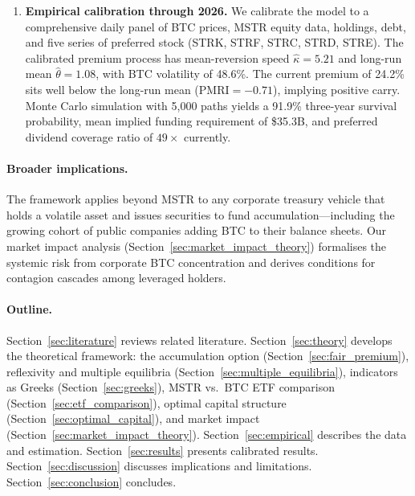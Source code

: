 \begin{enumerate}[leftmargin=*]
  \item \textbf{Empirical calibration through 2026.}
    We calibrate the model to a comprehensive daily panel of BTC prices,
    MSTR equity data, holdings, debt, and five series of preferred stock
    (STRK, STRF, STRC, STRD, STRE).  The calibrated premium process has
    mean-reversion speed $\hat\kappa = 5.21$ and long-run mean
    $\hat\theta = 1.08$, with BTC volatility of 48.6\%.  The current
    premium of 24.2\% sits well below the long-run mean
    ($\text{PMRI} = -0.71$), implying positive carry.
    Monte Carlo simulation with 5,000 paths yields a 91.9\% three-year
    survival probability, mean implied funding requirement of \$35.3B, and
    preferred dividend coverage ratio of $49\times$ currently.
\end{enumerate}

\paragraph{Broader implications.}
The framework applies beyond MSTR to any corporate treasury vehicle that
holds a volatile asset and issues securities to fund accumulation---including
the growing cohort of public companies adding BTC to their balance sheets.
Our market impact analysis (Section~\ref{sec:market_impact_theory})
formalises the systemic risk from corporate BTC concentration and derives
conditions for contagion cascades among leveraged holders.

\paragraph{Outline.}
Section~\ref{sec:literature} reviews related literature.
Section~\ref{sec:theory} develops the theoretical framework:
the accumulation option (Section~\ref{sec:fair_premium}),
reflexivity and multiple equilibria (Section~\ref{sec:multiple_equilibria}),
indicators as Greeks (Section~\ref{sec:greeks}),
MSTR vs.\ BTC ETF comparison (Section~\ref{sec:etf_comparison}),
optimal capital structure (Section~\ref{sec:optimal_capital}),
and market impact (Section~\ref{sec:market_impact_theory}).
Section~\ref{sec:empirical} describes the data and estimation.
Section~\ref{sec:results} presents calibrated results.
Section~\ref{sec:discussion} discusses implications and limitations.
Section~\ref{sec:conclusion} concludes.
